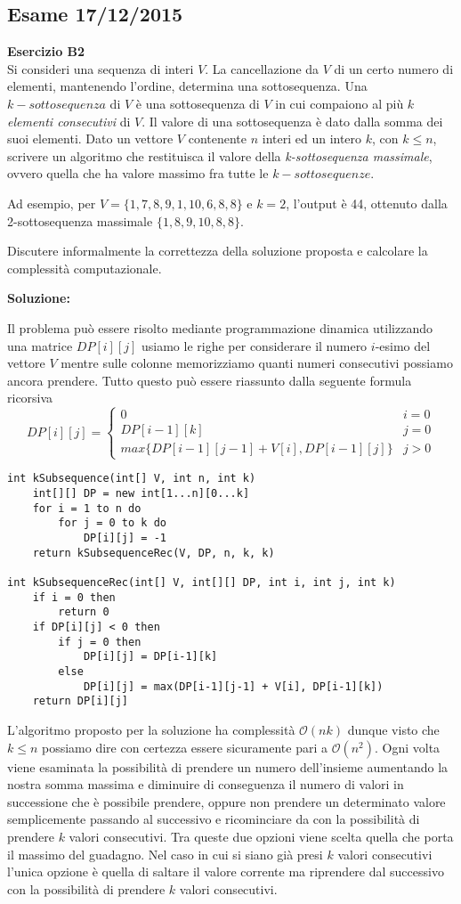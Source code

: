\documentclass[../cheatSheetAlgoritmi.tex]{subfiles}
\begin{document}
\subsection{Esame 17/12/2015}
\textbf{Esercizio B2}\\
Si consideri una sequenza di interi $V$. La cancellazione da $V$ di un certo numero di elementi, mantenendo l'ordine, determina una sottosequenza. Una $k-sottosequenza$ di $V$ è una sottosequenza di $V$ in cui compaiono al più $k$ \emph{elementi consecutivi} di $V$. Il valore di una sottosequenza è dato dalla somma dei suoi elementi. Dato un vettore $V$ contenente $n$ interi ed un intero $k$, con $k \leq n$, scrivere un algoritmo che restituisca il valore della \emph{k-sottosequenza massimale}, ovvero quella che ha valore massimo fra tutte le $k-sottosequenze$.

Ad esempio, per $V=\{1,7,8,9,1,10,6,8,8\}$ e $k = 2$, l'output è 44, ottenuto dalla 2-sottosequenza massimale $\{1,8,9,10,8,8\}$.

Discutere informalmente la correttezza della soluzione proposta e calcolare la complessità computazionale.

\textbf{Soluzione:}

Il problema può essere risolto mediante programmazione dinamica utilizzando una matrice $DP[i][j]$ usiamo le righe per considerare il numero $i$-esimo del vettore $V$ mentre sulle colonne memorizziamo quanti numeri consecutivi possiamo ancora prendere. Tutto questo può essere riassunto dalla seguente formula ricorsiva
\begin{equation*}
  	DP[i][j]=\begin{cases}
  		0 & \text{$i = 0$}\\
  		DP[i-1][k] & \text{$j = 0$}\\
  		max\{DP[i-1][j-1] + V[i], DP[i-1][j]\} & \text{$j > 0$}
  	\end{cases}
\end{equation*}
\begin{lstlisting}[caption=k-sottosequenza contigua]
int kSubsequence(int[] V, int n, int k)
	int[][] DP = new int[1...n][0...k]
	for i = 1 to n do
		for j = 0 to k do
			DP[i][j] = -1
	return kSubsequenceRec(V, DP, n, k, k)
	
int kSubsequenceRec(int[] V, int[][] DP, int i, int j, int k)
	if i = 0 then 
		return 0
	if DP[i][j] < 0 then
		if j = 0 then
			DP[i][j] = DP[i-1][k]
		else
			DP[i][j] = max(DP[i-1][j-1] + V[i], DP[i-1][k])
	return DP[i][j]
\end{lstlisting}
L'algoritmo proposto per la soluzione ha complessità $\mathcal{O}(nk)$ dunque visto che $k \leq n$ possiamo dire con certezza essere sicuramente pari a $\mathcal{O}(n^{2})$. Ogni volta viene esaminata la possibilità di prendere un numero dell'insieme aumentando la nostra somma massima e diminuire di conseguenza il numero di valori in successione che è possibile prendere, oppure non prendere un determinato valore semplicemente passando al successivo e ricominciare da con la possibilità di prendere $k$ valori consecutivi. Tra queste due opzioni viene scelta quella che porta il massimo del guadagno. Nel caso in cui si siano già presi $k$ valori consecutivi l'unica opzione è quella di saltare il valore corrente ma riprendere dal successivo con la possibilità di prendere $k$ valori consecutivi.
\newpage
\end{document}
